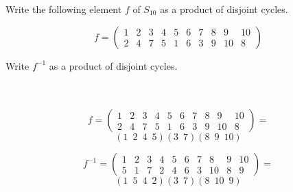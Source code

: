 Write the following element $f$ of $S_{10}$ as a product of disjoint cycles.

$$f=\left(\begin{array}{cccccccccc} 1 & 2 & 3 & 4 & 5 & 6 & 7 & 8 & 9 & 10\\
                                    2 & 4 & 7 & 5 & 1 & 6 & 3 & 9 & 10 & 8\end{array}\right)$$

Write $f^{-1}$ as a product of disjoint cycles.\\\\

\begin{solution}\renewcommand{\qedsymbol}{}\ \\
    $$f=\left(\begin{array}{cccccccccc} 1 & 2 & 3 & 4 & 5 & 6 & 7 & 8 & 9 & 10\\
                                        2 & 4 & 7 & 5 & 1 & 6 & 3 & 9 & 10 & 8\end{array}\right)=$$
    $$(1\;\:2\;\:4\;\:5)(3\;\:7)(8\;\:9\;\:10)$$

    $$f^{-1}=\left(\begin{array}{cccccccccc} 1 & 2 & 3 & 4 & 5 & 6 & 7 & 8 & 9 & 10\\ 
                                             5 & 1 & 7 & 2 & 4 & 6 & 3 & 10 & 8 & 9\end{array}\right)=$$
    $$(1\;\:5\;\:4\;\:2)(3\;\:7)(8\;\:10\;\:9)$$
\end{solution}